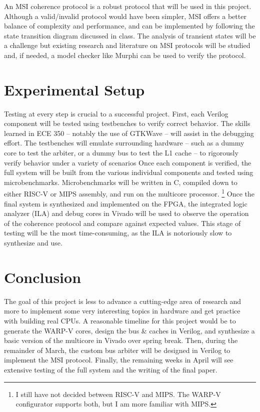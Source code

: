 \documentclass[10pt]{article}
\begin{document}
An MSI coherence protocol is a robust protocol that will be used in this project. Although a valid/invalid protocol would have been simpler, MSI offers a better balance of complexity and performance, and can be implemented by following the state transition diagram discussed in class. The analysis of transient states will be a challenge but existing research and literature on MSI protocols will be studied and, if needed, a model checker like Murphi can be used to verify the protocol. 



\section{Experimental Setup}
Testing at every step is crucial to a successful project. First, each Verilog component will be tested using testbenches to verify correct behavior. The skills learned in ECE 350 -- notably the use of GTKWave -- will assist in the debugging effort. The testbenches will emulate surrounding hardware -- such as a dummy core to test the arbiter, or a dummy bus to test the L1 cache -- to rigorously verify behavior under a variety of scenarios Once each component is verified, the full system will be built from the various individual components and tested using microbenchmarks. Microbenchmarks will be written in C, compiled down to either RISC-V or MIPS assembly, and run on the multicore processor. \footnote{I still have not decided between RISC-V and MIPS. The WARP-V configurator supports both, but I am more familiar with MIPS.} Once the final system is synthesized and implemented on the FPGA, the integrated logic analyzer (ILA) and debug cores in Vivado will be used to observe the operation of the coherence protocol and compare against expected values. This stage of testing will be the most time-consuming, as the ILA is notoriously slow to synthesize and use. 

\section{Conclusion}
The goal of this project is less to advance a cutting-edge area of research and more to implement some very interesting topics in hardware and get practice with building real CPUs. A reasonable timeline for this project would be to generate the WARP-V cores, design the bus \& caches in Verilog, and synthesize a basic version of the multicore in Vivado over spring break. Then, during the remainder of March, the custom bus arbiter will be designed in Verilog to implement the MSI protocol. Finally, the remaining weeks in April will see extensive testing of the full system and the writing of the final paper.
\end{document}
